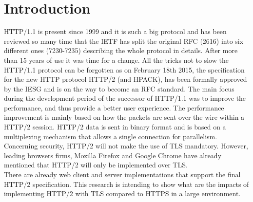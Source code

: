 \section{Introduction}
\label{chap:intro}
HTTP/1.1 is present since 1999 and it is such a big protocol and has been reviewed so many time that the IETF has split the original RFC (2616) into six different ones (7230-7235) describing the whole protocol in details. After more than 15 years of use it was time for a change. All the tricks not to slow the HTTP/1.1 protocol can be forgotten as on February 18th 2015, the specification for the new HTTP protocol HTTP/2 (and HPACK), has been formally approved by the IESG and is on the way to become an RFC standard.  
The main focus during the development period of the successor of HTTP/1.1 was to improve the performance, and thus provide a better user experience. The performance improvement is mainly based on how the packets are sent over the wire within a HTTP/2 session. HTTP/2 data is sent in binary format and is based on a multiplexing mechanism that allows a single connection for parallelism. Concerning security, HTTP/2 will not make the use of TLS mandatory. However, leading browsers firms, Mozilla Firefox and Google Chrome have already mentioned that HTTP/2 will only be implemented over TLS. \\
There are already web client and server implementations that support the final HTTP/2 specification. This research is intending to show what are the impacts of implementing HTTP/2 with TLS compared to HTTPS in a large environment.